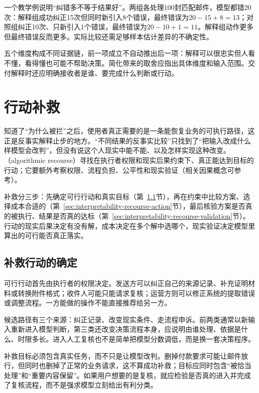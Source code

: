一个教学例说明“纠错多不等于结果好”。两组各处理100封匹配邮件，模型都错20次：解释组成功纠正15次但同时新引入8个错误，最终错误为$20-15+8=13$；对照组纠正10次、只新引入1个错误，最终错误为$20-10+1=11$。解释组动作更多但最终错误反而更多。实际比较还需足够样本估计差异的不确定性。

五个维度构成不同证据链，前一项成立不自动推出后一项：解释可以很忠实但人看不懂，看得懂也可能不帮助决策。简化带来的取舍应指出具体维度和输入范围。交付解释时还应明确接收者是谁、要完成什么判断或行动。

\section{行动补救}
\label{sec:interpretability-recourse}

知道了“为什么被拦”之后，使用者真正需要的是一条能恢复业务的可执行路径，这正是反事实解释止步的地方。“不同结果的反事实比较”只找到了“把输入改成什么样模型会改判”，但没有说这个人现实中能不能、以及怎样实现这种改变。（algorithmic recourse）寻找在执行者权限和现实后果约束下、真正能达到目标的行动；它要额外考察权限、流程负担、公平性和现实验证（相关因果概念可参考）。

补救分三步：先确定可行行动和真实目标（第~\ref{sec:interpretability-recourse-target}节），再在约束中比较方案、选择成本合适的（第~\ref{sec:interpretability-recourse-action}节），最后核验方案是否真的被执行、结果是否真的达标（第~\ref{sec:interpretability-recourse-validation}节）。行动的现实后果决定有没有解，成本决定在多个解中选哪个，现实验证决定模型里算出的可行能否真正落实。

\subsection{补救行动的确定}
\label{sec:interpretability-recourse-target}

可行行动首先由执行者的权限决定。发送方可以纠正自己的来源记录、补充证明材料或转换附件格式；收件人可能只能请求复核；运营方则可以修正系统的提取错误或调整流程。一方能做的操作不能直接推荐给另一方。

候选路径有三个来源：纠正记录、改变现实条件、走流程申诉。前两类通常以新输入重新进入模型判断，第三类还改变决策流程本身，应说明由谁处理、依据是什么、时限多长。进入人工复核也不是简单把模型分数调低，而是换一套决策程序。

补救目标必须包含真实任务，而不只是让模型改判。删掉付款要求可能让邮件放行，但同时也删掉了正常的业务请求，这不算成功补救；目标应同时包含“被恰当处理”和“重要内容保留”。如果用户想要的是复核，就应检验是否真的进入并完成了复核流程，而不是强求模型立刻给出有利分类。

